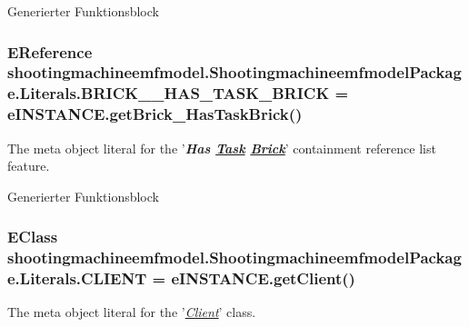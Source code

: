 Generierter Funktionsblock \hypertarget{interfaceshootingmachineemfmodel_1_1_shootingmachineemfmodel_package_1_1_literals_ace663d9af7558e3ffaf107fc2bfd2a1d}{
\subsubsection[{B\-R\-I\-C\-K\-\_\-\-\_\-\-H\-A\-S\-\_\-\-T\-A\-S\-K\-\_\-\-B\-R\-I\-C\-K}]{\setlength{\rightskip}{0pt plus 5cm}E\-Reference shootingmachineemfmodel.\-Shootingmachineemfmodel\-Package.\-Literals.\-B\-R\-I\-C\-K\-\_\-\-\_\-\-H\-A\-S\-\_\-\-T\-A\-S\-K\-\_\-\-B\-R\-I\-C\-K = e\-I\-N\-S\-T\-A\-N\-C\-E.\-get\-Brick\-\_\-\-Has\-Task\-Brick()}}\label{interfaceshootingmachineemfmodel_1_1_shootingmachineemfmodel_package_1_1_literals_ace663d9af7558e3ffaf107fc2bfd2a1d}
The meta object literal for the '{\itshape {\bfseries Has \hyperlink{interfaceshootingmachineemfmodel_1_1_task}{Task} \hyperlink{interfaceshootingmachineemfmodel_1_1_brick}{Brick}}}' containment reference list feature.

Generierter Funktionsblock \hypertarget{interfaceshootingmachineemfmodel_1_1_shootingmachineemfmodel_package_1_1_literals_a94f1cf9078e7f24c78b992d0e1212708}{
\subsubsection[{C\-L\-I\-E\-N\-T}]{\setlength{\rightskip}{0pt plus 5cm}E\-Class shootingmachineemfmodel.\-Shootingmachineemfmodel\-Package.\-Literals.\-C\-L\-I\-E\-N\-T = e\-I\-N\-S\-T\-A\-N\-C\-E.\-get\-Client()}}\label{interfaceshootingmachineemfmodel_1_1_shootingmachineemfmodel_package_1_1_literals_a94f1cf9078e7f24c78b992d0e1212708}
The meta object literal for the '\hyperlink{classshootingmachineemfmodel_1_1impl_1_1_client_impl}{{\itshape Client}}' class.

